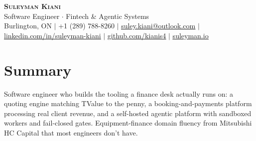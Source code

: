 \documentclass[letterpaper,11pt]{article}
\begin{document}
\begin{center}
    \textbf{\Huge \scshape Suleyman Kiani} \\ \vspace{3pt}
    \small Software Engineer $\cdot$ Fintech \& Agentic Systems \\ \vspace{3pt}
    \footnotesize Burlington, ON $|$ +1 (289) 788-8260 $|$ \href{mailto:suley.kiani@outlook.com}{\underline{suley.kiani@outlook.com}} $|$ \href{https://www.linkedin.com/in/suleyman-kiani}{\underline{linkedin.com/in/suleyman-kiani}} $|$ \href{https://github.com/kianis4}{\underline{github.com/kianis4}} $|$ \href{https://suleyman.io}{\underline{suleyman.io}}
\end{center}

\section{Summary}
\vspace{2pt}
\small{Software engineer who builds the tooling a finance desk actually runs on: a quoting engine matching TValue to the penny, a booking-and-payments platform processing real client revenue, and a self-hosted agentic platform with sandboxed workers and fail-closed gates. Equipment-finance domain fluency from Mitsubishi HC Capital that most engineers don't have.}
\vspace{-4pt}

\end{document}
